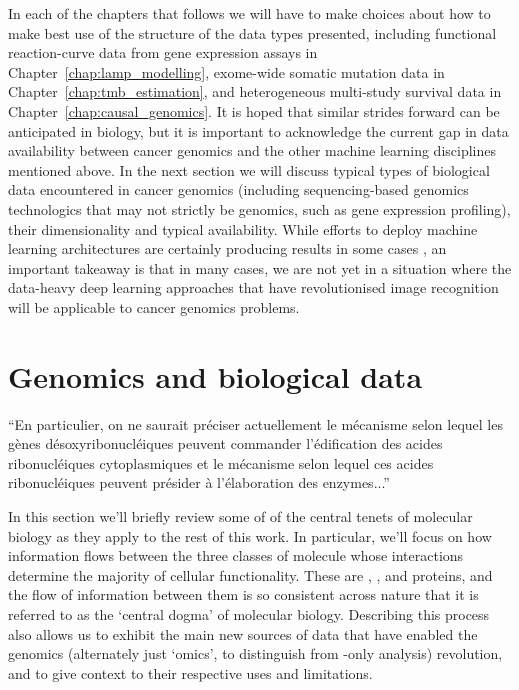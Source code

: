 \documentclass[thesis.tex]{subfiles}
\begin{document}
In each of the chapters that follows we will have to make choices about how to make best use of the structure of the data types presented, including functional reaction-curve data from gene expression assays in Chapter~\ref{chap:lamp_modelling}, exome-wide somatic mutation data in Chapter~\ref{chap:tmb_estimation}, and heterogeneous multi-study survival data in Chapter~\ref{chap:causal_genomics}. 
It is hoped that similar strides forward can be anticipated in biology, but it is important to acknowledge the current gap in data availability between cancer genomics and the other machine learning disciplines mentioned above. In the next section we will discuss typical types of biological data encountered in cancer genomics (including sequencing-based genomics technologics that may not strictly be genomics, such as gene expression profiling), their dimensionality and typical availability. While efforts to deploy machine learning architectures are certainly producing results in some cases \citep{dubourg-felonneau_flatsomatic_2019, dubourg-felonneau_learning_2019}, an important takeaway is that in many cases, we are not yet in a situation where the data-heavy deep learning approaches that have revolutionised image recognition will be applicable to cancer genomics problems. 


\section{Genomics and biological data}
\epigraph{``En particulier, on ne
saurait préciser actuellement le mécanisme selon lequel
les gènes désoxyribonucléiques peuvent commander l'édification des acides ribonucléiques cytoplasmiques et le
mécanisme selon lequel ces acides ribonucléiques
peuvent présider à l'élaboration des enzymes...''}{\citet{boivin_sur_1947}}

In this section we'll briefly review some of of the central tenets of molecular biology as they apply to the rest of this work. In particular, we'll focus on how information flows between the three classes of molecule whose interactions determine the majority of cellular functionality. These are , , and proteins, and the flow of information between them is so consistent across nature that it is referred to as the `central dogma' of molecular biology. Describing this process also allows us to exhibit the main new sources of data that have enabled the genomics (alternately just `omics', to distinguish from -only analysis) revolution, and to give context to their respective uses and limitations. 
\end{document}
